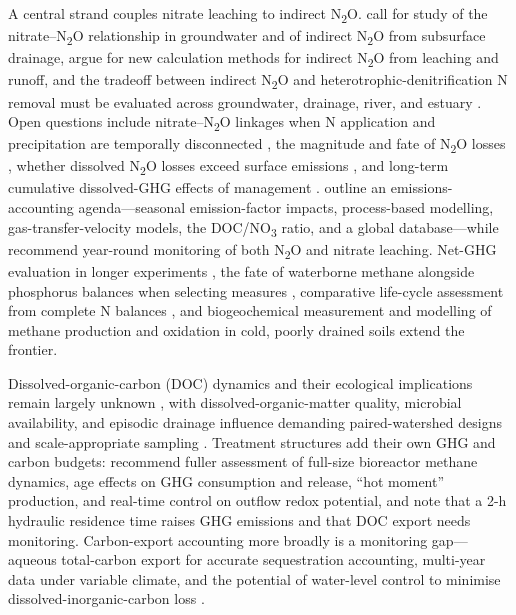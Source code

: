 \documentclass[11pt]{article}
\begin{document}
A central strand couples nitrate leaching to indirect N\textsubscript{2}O.
\textcite{Sawamoto2003} call for study of the nitrate--N\textsubscript{2}O
relationship in groundwater and of indirect N\textsubscript{2}O from subsurface
drainage, \textcite{Minamikawa2015} argue for new calculation methods for
indirect N\textsubscript{2}O from leaching and runoff, and the tradeoff between
indirect N\textsubscript{2}O and heterotrophic-denitrification N removal must be
evaluated across groundwater, drainage, river, and estuary
\parencite{Minamikawa2013,Minamikawa2010}. Open questions include
nitrate--N\textsubscript{2}O linkages when N application and precipitation are
temporally disconnected \parencite{OBrien2022}, the magnitude and fate of
N\textsubscript{2}O losses \parencite{Burton2024}, whether dissolved
N\textsubscript{2}O losses exceed surface emissions \parencite{Smith2019}, and
long-term cumulative dissolved-GHG effects of management \parencite{Oliveira2025}.
\textcite{Webb2021} outline an emissions-accounting agenda---seasonal
emission-factor impacts, process-based modelling, gas-transfer-velocity models,
the DOC/NO\textsubscript{3} ratio, and a global database---while
\textcite{Fontes2019} recommend year-round monitoring of both N\textsubscript{2}O
and nitrate leaching. Net-GHG evaluation in longer experiments
\parencite{PrezaFontes2023}, the fate of waterborne methane alongside phosphorus
balances when selecting measures \parencite{Carstensen2021}, comparative
life-cycle assessment from complete N balances \parencite{HernandezRamirez2011},
and biogeochemical measurement and modelling of methane production and oxidation
in cold, poorly drained soils \parencite{Kumar2014b} extend the frontier.

Dissolved-organic-carbon (DOC) dynamics and their ecological implications remain
largely unknown \parencite{Ruark2009,Furukawa2008}, with dissolved-organic-matter
quality, microbial availability, and episodic drainage influence demanding
paired-watershed designs and scale-appropriate sampling
\parencite{Dalzell2011,Bellmore2015}. Treatment structures add their own GHG and
carbon budgets: \textcite{Brunton2024} recommend fuller assessment of full-size
bioreactor methane dynamics, age effects on GHG consumption and release,
``hot moment'' production, and real-time control on outflow redox potential, and
\textcite{Strock2025} note that a 2-h hydraulic residence time raises GHG
emissions and that DOC export needs monitoring. Carbon-export accounting more
broadly is a monitoring gap---aqueous total-carbon export for accurate
sequestration accounting, multi-year data under variable climate, and the
potential of water-level control to minimise dissolved-inorganic-carbon loss
\parencite{Schilling2023}.
\end{document}
